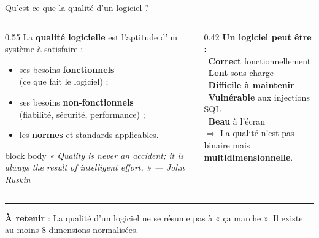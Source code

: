 \documentclass[aspectratio=169,11pt]{beamer}
\newcommand{\takeaway}[1]{%
\vfill\begin{beamercolorbox}[wd=\linewidth,sep=0.4em]{}
\color{accent2}\rule[0.6ex]{1.2em}{1.2pt}\hspace{0.4em}%
\textbf{\color{accent2}\small À retenir} \textcolor{textsoft}{:} %
{\small\color{textmain}#1}
\end{beamercolorbox}}
\newcommand{\oui}[1]{\textcolor{good}{\ding{51}}~#1}
\newcommand{\non}[1]{\textcolor{bad}{\ding{55}}~#1}
\begin{document}
\begin{frame}[t]{Qu'est-ce que la qualité d'un logiciel ?}
\begin{columns}[T,onlytextwidth]
\begin{column}{0.55\textwidth}
\vspace{0.1cm}
La \textbf{qualité logicielle} est l'aptitude d'un système à satisfaire :
\begin{itemize}\footnotesize
    \item ses besoins \textbf{fonctionnels} \\
    {\color{textsoft}\scriptsize (ce que fait le logiciel) ;}
    \item ses besoins \textbf{non-fonctionnels} \\
    {\color{textsoft}\scriptsize (fiabilité, sécurité, performance) ;}
    \item les \textbf{normes} et standards applicables.
\end{itemize}
\vspace{0.2cm}
\begin{beamercolorbox}[sep=0.5em,rounded=true]{block body}
\scriptsize\itshape
« Quality is never an accident; it is always the result of intelligent effort. »
\textcolor{textsoft}{--- John Ruskin}
\end{beamercolorbox}
\end{column}
\begin{column}{0.42\textwidth}
\vspace{0.1cm}
\textbf{Un logiciel peut être :}\\[0.2em]
\footnotesize
\oui{\textbf{Correct} fonctionnellement} \\[0.15em]
\non{\textbf{Lent} sous charge} \\[0.15em]
\non{\textbf{Difficile à maintenir}} \\[0.15em]
\non{\textbf{Vulnérable} aux injections SQL} \\[0.15em]
\oui{\textbf{Beau} à l'écran}\\[0.4em]
\textcolor{textsoft}{$\Rightarrow$ La qualité n'est pas binaire mais \textbf{multidimensionnelle}.}
\end{column}
\end{columns}
\takeaway{La qualité d'un logiciel ne se résume pas à « ça marche ». Il existe au moins 8 dimensions normalisées.}
\end{frame}
\end{document}
